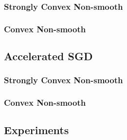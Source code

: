 \subsubsection{Strongly Convex Non-smooth}
\label{sec:sgdscvxnonsmth}

\subsubsection{Convex Non-smooth}
\label{sec:sgdcvxnonsmth}


\subsection{Accelerated SGD}
\subsubsection{Strongly Convex Non-smooth}
\label{sec:nasgdscvxnonsmth}

\subsubsection{Convex Non-smooth}
\label{sec:nasgdcvxnonsmth}


\subsection{Experiments}
\label{sec:expsupp}


